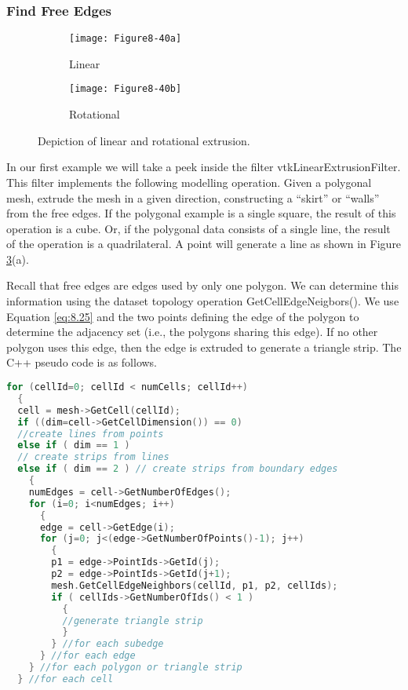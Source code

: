 \subsubsection{Find Free Edges}

\begin{figure}[!htb]
    \centering
    \begin{subfigure}{0.48\linewidth}
        \centering
        \texttt{[image: Figure8-40a]}
        \caption{Linear}\label{fig:Figure8-40a}
    \end{subfigure}
    \hfill
    \begin{subfigure}{0.48\linewidth}
        \centering
        \texttt{[image: Figure8-40b]}
        \caption{Rotational}\label{fig:Figure8-40b}
    \end{subfigure}%
    \caption{Depiction of linear and rotational extrusion.}
    \label{fig:Figure8-40}
\end{figure}

In our first example we will take a peek inside the filter vtkLinearExtrusionFilter. This filter implements the following modelling operation. Given a polygonal mesh, extrude the mesh in a given direction, constructing a ``skirt'' or ``walls'' from the free edges. If the polygonal example is a single square, the result of this operation is a cube. Or, if the polygonal data consists of a single line, the result of the operation is a quadrilateral. A point will generate a line as shown in Figure \ref{fig:Figure8-40}(a).

Recall that free edges are edges used by only one polygon. We can determine this information using the dataset topology operation GetCellEdgeNeigbors(). We use Equation \ref{eq:8.25} and the two points defining the edge of the polygon to determine the adjacency set (i.e., the polygons sharing this edge). If no other polygon uses this edge, then the edge is extruded to generate a triangle strip. The C++ pseudo code is as follows.

\begin{lstlisting}[language=C++, caption={Determining free edges.}]
for (cellId=0; cellId < numCells; cellId++)
  {
  cell = mesh->GetCell(cellId);
  if ((dim=cell->GetCellDimension()) == 0)
  //create lines from points
  else if ( dim == 1 )
  // create strips from lines
  else if ( dim == 2 ) // create strips from boundary edges
    {
    numEdges = cell->GetNumberOfEdges();
    for (i=0; i<numEdges; i++)
      {
      edge = cell->GetEdge(i);
      for (j=0; j<(edge->GetNumberOfPoints()-1); j++)
        {
        p1 = edge->PointIds->GetId(j);
        p2 = edge->PointIds->GetId(j+1);
        mesh.GetCellEdgeNeighbors(cellId, p1, p2, cellIds);
        if ( cellIds->GetNumberOfIds() < 1 )
          {
          //generate triangle strip
          }
        } //for each subedge
      } //for each edge
    } //for each polygon or triangle strip
  } //for each cell
\end{lstlisting}

